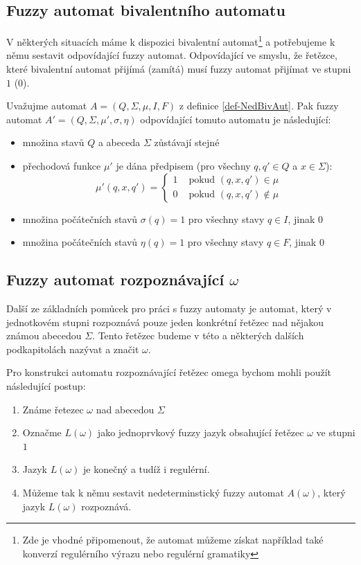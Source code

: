 \documentclass[a4paper,10pt]{article}
\begin{document}
\subsection{Fuzzy automat bivalentního automatu}
V některých situacích máme k dispozici  bivalentní automat\footnote{Zde je vhodné připomenout, že automat můžeme získat například také konverzí regulérního výrazu nebo regulérní gramatiky} a potřebujeme k němu sestavit odpovídající fuzzy automat. Odpovídající ve smyslu, že řetězce, které bivalentní automat přijímá (zamítá) musí fuzzy automat přijímat ve stupni $1$ ($0$).

Uvažujme automat $A = (Q, \Sigma, \mu, I, F)$ z definice \ref{def-NedBivAut}. Pak fuzzy automat $A' = (Q, \Sigma, \mu', \sigma, \eta)$ odpovídající tomuto automatu je následující:
\begin{itemize}
 \item množina stavů $Q$ a abeceda $\Sigma$ zůstávají stejné
 \item přechodová funkce $\mu'$ je dána předpisem (pro všechny $q, q' \in Q$ a $x \in \Sigma$):
 $$
  \mu'(q, x, q') = 
    \begin{cases}
     1 & \text{ pokud $(q, x, q') \in \mu$} \\
     0 & \text{ pokud $(q, x, q') \notin \mu$}
    \end{cases}
 $$
 \item množina počátečních stavů $\sigma(q) = 1$ pro všechny stavy $q \in I$, jinak $0$
 \item množina počátečních stavů $\eta(q) = 1$ pro všechny stavy $q \in F$, jinak $0$
\end{itemize}



\subsection{Fuzzy automat rozpoznávající $\omega$}
Další ze základních pomůcek pro práci s fuzzy automaty je automat, který v jednotkovém stupni rozpoznává pouze jeden konkrétní řetězec nad nějakou známou abecedou $\Sigma$. Tento řetězec budeme v této a některých dalších podkapitolách nazývat  a značit $\omega$.

Pro konstrukci automatu rozpoznávající řetězec omega bychom mohli použít následující postup:
\begin{enumerate} 
 \item Známe řetezec $\omega$ nad abecedou $\Sigma$
 \item Označme $L(\omega)$ jako jednoprvkový fuzzy jazyk obsahující řetězec $\omega$ ve stupni $1$
 \item Jazyk $L(\omega)$ je konečný a tudíž i regulérní. 
 \item Můžeme tak k němu sestavit nedeterminstický fuzzy automat $A(\omega)$, který jazyk $L(\omega)$ rozpoznává.
\end{enumerate}
\end{document}
